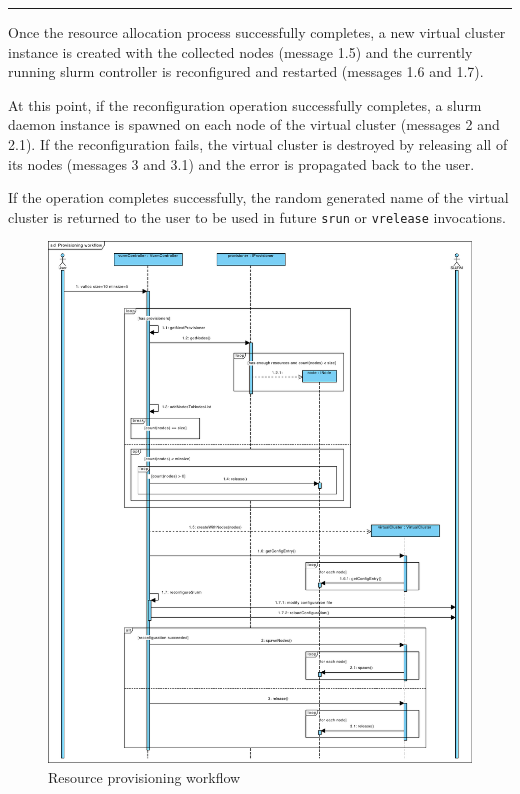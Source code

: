 \noindent\vspace{-4mm}\rule{\textwidth}{.3pt}
\vspace*{1mm}

Once the resource allocation process successfully completes, a new virtual cluster instance is created with the collected nodes (message 1.5) and the currently running \gls{slurm} controller is reconfigured and restarted (messages 1.6 and 1.7).

At this point, if the reconfiguration operation successfully completes, a \gls{slurm} daemon instance is spawned on each node of the virtual cluster (messages 2 and 2.1). If the reconfiguration fails, the virtual cluster is destroyed by releasing all of its nodes (messages 3 and 3.1) and the error is propagated back to the user.

If the operation completes successfully, the random generated name of the virtual cluster is returned to the user to be used in future \texttt{srun} or \texttt{vrelease} invocations.

\begin{figure}[p]
	\centering
	\includegraphics[width=1\textwidth]{figures/provisioning-workflow}
	\caption{Resource provisioning workflow}
	\label{fig:provisioning}
\end{figure}



